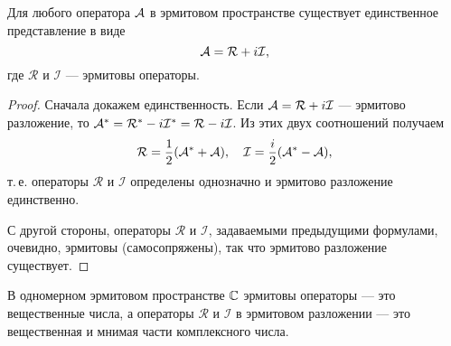 \begin{theorem}
    Для любого оператора $\mathcal{A}$ в эрмитовом пространстве существует единственное представление в виде
    \[
        \mathcal{A} = \mathcal{R} + i\mathcal{I},
    \]
    где $\mathcal{R}$ и $\mathcal{I}$ --- эрмитовы операторы.
\end{theorem}

\begin{proof}
    Сначала докажем единственность. Если $\mathcal{A} = \mathcal{R} + i\mathcal{I}$ --- эрмитово разложение, то $\mathcal{A}^\ast = \mathcal{R}^\ast - i\mathcal{I}^\ast = \mathcal{R} - i\mathcal{I}$. Из этих двух соотношений получаем
    \[
        \mathcal{R} = \frac{1}{2}(\mathcal{A}^\ast + \mathcal{A}),\quad\mathcal{I} = \frac{i}{2}(\mathcal{A}^\ast - \mathcal{A}),
    \]
    т.\,е. операторы $\mathcal{R}$ и $\mathcal{I}$ определены однозначно и эрмитово разложение единственно.

    С другой стороны, операторы $\mathcal{R}$ и $\mathcal{I}$, задаваемыми предыдущими формулами, очевидно, эрмитовы (самосопряжены), так что эрмитово разложение существует.
\end{proof}

В одномерном эрмитовом пространстве $\mathbb{C}$ эрмитовы операторы --- это вещественные числа, а операторы $\mathcal{R}$ и $\mathcal{I}$ в эрмитовом разложении --- это вещественная и мнимая части комплексного числа.

